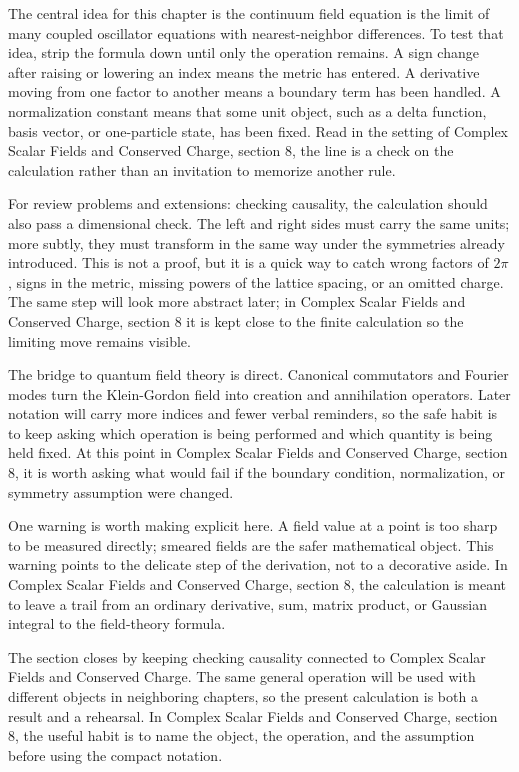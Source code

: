 The central idea for this chapter is the continuum field equation is the limit of many coupled oscillator equations with nearest-neighbor differences.  To test that idea, strip the formula down until only the operation remains.  A sign change after raising or lowering an index means the metric has entered.  A derivative moving from one factor to another means a boundary term has been handled.  A normalization constant means that some unit object, such as a delta function, basis vector, or one-particle state, has been fixed.  Read in the setting of Complex Scalar Fields and Conserved Charge, section 8, the line is a check on the calculation rather than an invitation to memorize another rule.

For review problems and extensions: checking causality, the calculation should also pass a dimensional check.  The left and right sides must carry the same units; more subtly, they must transform in the same way under the symmetries already introduced.  This is not a proof, but it is a quick way to catch wrong factors of \(2\pi\), signs in the metric, missing powers of the lattice spacing, or an omitted charge.  The same step will look more abstract later; in Complex Scalar Fields and Conserved Charge, section 8 it is kept close to the finite calculation so the limiting move remains visible.

The bridge to quantum field theory is direct.  Canonical commutators and Fourier modes turn the Klein-Gordon field into creation and annihilation operators.  Later notation will carry more indices and fewer verbal reminders, so the safe habit is to keep asking which operation is being performed and which quantity is being held fixed.  At this point in Complex Scalar Fields and Conserved Charge, section 8, it is worth asking what would fail if the boundary condition, normalization, or symmetry assumption were changed.

One warning is worth making explicit here.  A field value at a point is too sharp to be measured directly; smeared fields are the safer mathematical object.  This warning points to the delicate step of the derivation, not to a decorative aside.  In Complex Scalar Fields and Conserved Charge, section 8, the calculation is meant to leave a trail from an ordinary derivative, sum, matrix product, or Gaussian integral to the field-theory formula.

The section closes by keeping checking causality connected to Complex Scalar Fields and Conserved Charge.  The same general operation will be used with different objects in neighboring chapters, so the present calculation is both a result and a rehearsal.  In Complex Scalar Fields and Conserved Charge, section 8, the useful habit is to name the object, the operation, and the assumption before using the compact notation.



